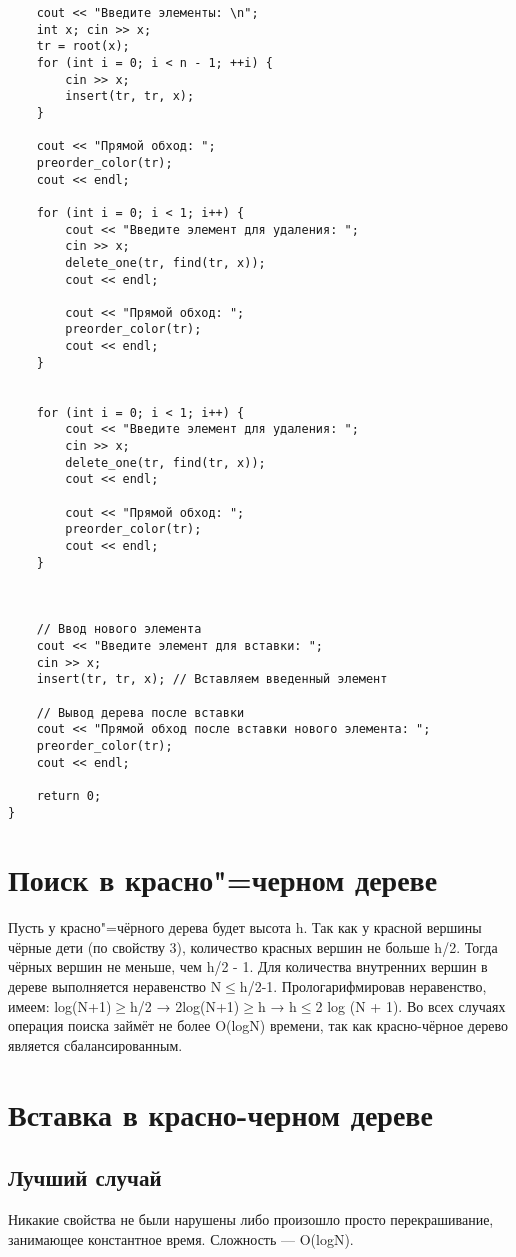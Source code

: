 \documentclass[otchet]{SCWorks}
\begin{document}
\begin{verbatim}
	cout << "Введите элементы: \n";
	int x; cin >> x;
	tr = root(x);
	for (int i = 0; i < n - 1; ++i) {
		cin >> x;
		insert(tr, tr, x);
	}

	cout << "Прямой обход: ";
	preorder_color(tr);
	cout << endl;

	for (int i = 0; i < 1; i++) {
		cout << "Введите элемент для удаления: ";
		cin >> x;
		delete_one(tr, find(tr, x));
		cout << endl;

		cout << "Прямой обход: ";
		preorder_color(tr);
		cout << endl;
	}


	for (int i = 0; i < 1; i++) {
		cout << "Введите элемент для удаления: ";
		cin >> x;
		delete_one(tr, find(tr, x));
		cout << endl;

		cout << "Прямой обход: ";
		preorder_color(tr);
		cout << endl;
	}



	// Ввод нового элемента
	cout << "Введите элемент для вставки: ";
	cin >> x;
	insert(tr, tr, x); // Вставляем введенный элемент

	// Вывод дерева после вставки
	cout << "Прямой обход после вставки нового элемента: ";
	preorder_color(tr);
	cout << endl;

	return 0;
}
\end{verbatim}

\section{Поиск в красно"=черном дереве}
Пусть у красно"=чёрного дерева будет высота h. Так как у красной вершины чёрные дети (по свойству 3), количество красных вершин не больше h/2. Тогда чёрных вершин не меньше, чем h/2 - 1. Для количества внутренних вершин в дереве выполняется неравенство N$\leq$h/2-1. Прологарифмировав неравенство, имеем: log(N+1)$\geq$h/2 → 2log(N+1)$\geq$h → h$\leq$2 log (N + 1).
Во всех случаях операция поиска займёт не более O(logN) времени, так как красно-чёрное дерево является сбалансированным.

\section{Вставка в красно-черном дереве}
\subsection{Лучший случай}
Никакие свойства не были нарушены либо произошло просто перекрашивание, занимающее константное время. Сложность — O(logN).
\end{document}
